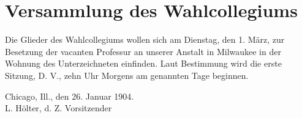 \chapter{Versammlung des Wahlcollegiums}

Die Glieder des Wahlcollegiums wollen sich am Dienstag, den 1. März, zur Besetzung der vacanten Professur an unserer Anstalt in Milwaukee in der Wohnung des Unterzeichneten einfinden. Laut Bestimmung wird die erste Sitzung, D. V., zehn Uhr Morgens am genannten Tage beginnen.

\begin{unterschrift}
Chicago, Ill., den 26. Januar 1904.\\
L. Hölter, d. Z. Vorsitzender
\end{unterschrift}
